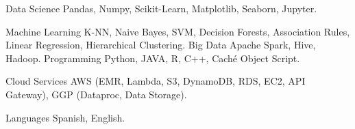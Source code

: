 

\begin{cvskills}

  \cvskill
    {Data Science} %
    {Pandas, Numpy, Scikit-Learn, Matplotlib, Seaborn, Jupyter.} %

  \cvskill
    {Machine Learning} %
    {K-NN, Naive Bayes, SVM, Decision Forests, Association Rules, Linear Regression, Hierarchical Clustering.} %
  \cvskill
    {Big Data} %
    {Apache Spark, Hive, Hadoop.} %
  \cvskill
    {Programming} %
    {Python, JAVA, R, C++, Caché Object Script.} %

  \cvskill
    {Cloud Services} %
    {AWS (EMR, Lambda, S3, DynamoDB, RDS, EC2, API Gateway), GGP (Dataproc, Data Storage).} %

  \cvskill
    {Languages} %
    {Spanish, English.} %
\end{cvskills}
